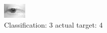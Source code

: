 \begin{figure}[h!]
\begin{center}
\includegraphics[width=0.60\columnwidth]{figures/ID2716_class_3_target_4.png}
\end{center}
\caption{ Classification: 3 actual target: 4}
\label{fig:ID2716_class_3_target_4}
\end{figure}
